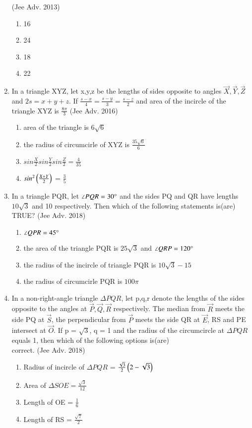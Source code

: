 \documentclass[journal,12pt,twocolumn]{IEEEtran}
\theoremstyle{remark}
\begin{document}
\begin{enumerate}
    \hfill{(Jee Adv. 2013)}
    \begin{multicols}{2}
    \begin{enumerate}
    \item 16
    \item 24
    \item 18
    \item 22
    \end{enumerate}
    \end{multicols}
    \item In a triangle XYZ, let x,y,z be the lengths of sides opposite to angles $\vec{X},\vec{Y},\vec{Z}$ and $2s = x+y+z$. If ${\frac{s-x}{4}}={\frac{s-y}{3}}={\frac{s-z}{2}}$ and area of the incircle of the triangle XYZ is ${\frac{8\pi}{3}}$
    \hfill{(Jee Adv. 2016)}
    \begin{enumerate}
    \item area of the triangle is 6$\sqrt{6}$
    \item the radius of circumcirle of XYZ is ${\frac{35\sqrt{6}}{6}}$
    \item $sin\frac{X}{2}sin\frac{Y}{2}sin\frac{Z}{2} = \frac{4}{35}$
    \item $sin^{2}\left(\frac{X+Y}{2}\right)$ = $\frac{3}{5}$
    \end{enumerate}
    \item In a triangle PQR, let $\angle PQR = 30\degree$ and the sides PQ and QR have lengths $10\sqrt{3}$ and 10 respectively. Then which of the following statements is(are) TRUE?
    \hfill{(Jee Adv. 2018)}
    \begin{enumerate}
    \item $\angle QPR = 45\degree$
    \item the area of the triangle PQR is $25\sqrt{3}$ and $\angle QRP = 120\degree$
    \item the radius of the incircle of triangle PQR is $10\sqrt{3}-15$
    \item the radius of circumcirle PQR is $100\pi$
    \end{enumerate}
    \item In a non-right-angle triangle $\Delta PQR$, let p,q,r denote the lengths of the sides opposite to the angles at $\vec{P},\vec{Q},\vec{R}$ respectively. The median from $\vec{R}$ meets the side PQ at $\vec{S}$, the perpendicular from $\vec{P}$ meets the side QR at $\vec{E}$, RS and PE
	    intersect at $\vec{O}$. If p = $\sqrt{3}$, q = 1 and the radius of the circumcircle at $\Delta PQR$ equals 1, then which of the following options is(are)\\ correct.
    \hfill{(Jee Adv. 2018)}
    \begin{enumerate}
    \item Radius of incircle of $\Delta PQR$ = $\frac{\sqrt{3}}{2}\left(2-\sqrt{3}\right)$
    \item Area of $\Delta SOE = \frac{\sqrt{3}}{12}$
    \item Length of OE = $\frac{1}{6}$
    \item Length of RS = $\frac{\sqrt{7}}{2}$
    \end{enumerate}

\end{enumerate}
\end{document}
